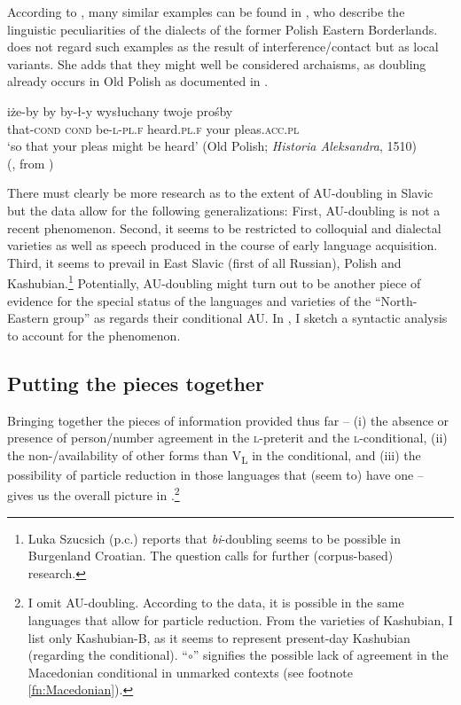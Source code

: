 \documentclass[output=paper]{langscibook}
\begin{document}
\noindent According to \citet[132]{Blaszczyk2018}, many similar examples can be found in \citet{GrekPabisowaMaryniakowa1999}, who describe the linguistic peculiarities of the dialects of the former Polish Eastern Borderlands. \citet{Zielinska2002} does not regard such examples as the result of interference/contact but as local variants. She adds that they might well be considered archaisms, as doubling already occurs in Old Polish as documented in .

\ea\gll iże-by by by-ł-y wysłuchany {twoje prośby} \\
that-\textsc{cond} \textsc{cond} be\textsc{-l-pl.f} heard.\textsc{pl.f} {your pleas}.\textsc{acc.pl} \\
\glt `so that your pleas might be heard' \hfill (Old Polish; \textit{Historia  Aleksandra}, 1510) \\ \hfill (\citealt[113]{Rittel1975}, from \citealt[133]{Blaszczyk2018})
\label{pitsch:ex:doubling_OldPolish}
\z

\noindent There must clearly be more research as to the extent of AU-doubling in Slavic but the data allow for the following generalizations: First, AU-doubling is not a recent phenomenon. Second, it seems to be restricted to colloquial and dialectal varieties as well as speech produced in the course of early language acquisition. Third, it seems to prevail in East Slavic (first of all Russian), Polish and Kashubian.\footnote{Luka Szucsich (p.c.) reports that \textit{bi}-doubling seems to be possible in Burgenland Croatian. The question calls for further (corpus-based) research.} Potentially, AU-doubling might turn out to be another piece of evidence for the special status of the languages and varieties of the ``North-Eastern group'' as regards their conditional AU. In , I sketch a syntactic analysis to account for the phenomenon.

    \largerpage[-1]


\subsection{Putting the pieces together}

Bringing together the pieces of information provided thus far -- (i) the absence or presence of person/number agreement in the \textsc{l-}preterit and the \textsc{l-}conditional, (ii) the non-/availability of other forms than V\textsubscript{L} in the conditional, and (iii) the possibility of particle reduction in those languages that (seem to) have one -- gives us the overall picture in .\footnote{I omit AU-doubling. According to the data, it is possible in the same languages that allow for particle reduction. From the varieties of Kashubian, I list only Kashubian-B, as it seems to represent present-day Kashubian (regarding the conditional). ``$\circ$'' signifies the possible lack of agreement in the Macedonian conditional in unmarked contexts (see footnote \ref{fn:Macedonian}).}
\end{document}
